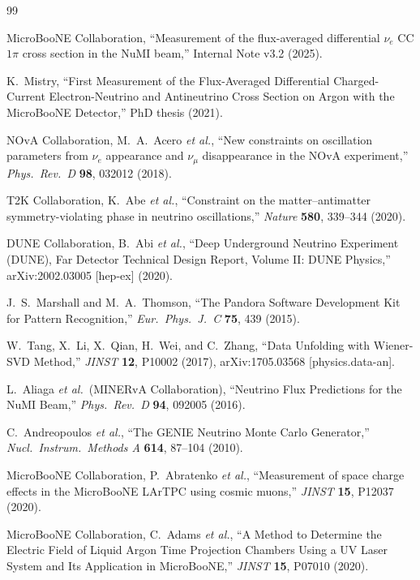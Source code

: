 \begin{thebibliography}{99}

  MicroBooNE Collaboration,
  ``Measurement of the flux-averaged differential $\nu_e$ CC$1\pi$ cross section
  in the NuMI beam,'' Internal Note v3.2 (2025).

  K.~Mistry,
  ``First Measurement of the Flux-Averaged Differential Charged-Current
  Electron-Neutrino and Antineutrino Cross Section on Argon with the MicroBooNE
  Detector,'' PhD thesis (2021).

  NOvA Collaboration, M.~A.~Acero \textit{et al.},
  ``New constraints on oscillation parameters from $\nu_e$ appearance and
  $\nu_\mu$ disappearance in the NOvA experiment,''
  \textit{Phys.\ Rev.\ D} \textbf{98}, 032012 (2018).

  T2K Collaboration, K.~Abe \textit{et al.},
  ``Constraint on the matter--antimatter symmetry-violating phase in neutrino
  oscillations,''
  \textit{Nature} \textbf{580}, 339--344 (2020).

  DUNE Collaboration, B.~Abi \textit{et al.},
  ``Deep Underground Neutrino Experiment (DUNE), Far Detector Technical Design
  Report, Volume II: DUNE Physics,'' arXiv:2002.03005 [hep-ex] (2020).

  J.~S.~Marshall and M.~A.~Thomson,
  ``The Pandora Software Development Kit for Pattern Recognition,''
  \textit{Eur.\ Phys.\ J.\ C} \textbf{75}, 439 (2015).

  W.~Tang, X.~Li, X.~Qian, H.~Wei, and C.~Zhang,
  ``Data Unfolding with Wiener-SVD Method,''
  \textit{JINST} \textbf{12}, P10002 (2017), arXiv:1705.03568 [physics.data-an].

  L.~Aliaga \textit{et al.}\ (MINERvA Collaboration),
  ``Neutrino Flux Predictions for the NuMI Beam,''
  \textit{Phys.\ Rev.\ D} \textbf{94}, 092005 (2016).

  C.~Andreopoulos \textit{et al.},
  ``The GENIE Neutrino Monte Carlo Generator,''
  \textit{Nucl.\ Instrum.\ Methods A} \textbf{614}, 87--104 (2010).

  MicroBooNE Collaboration, P.~Abratenko \textit{et al.},
  ``Measurement of space charge effects in the MicroBooNE LArTPC using cosmic
  muons,''
  \textit{JINST} \textbf{15}, P12037 (2020).

  MicroBooNE Collaboration, C.~Adams \textit{et al.},
  ``A Method to Determine the Electric Field of Liquid Argon Time Projection
  Chambers Using a UV Laser System and Its Application in MicroBooNE,''
  \textit{JINST} \textbf{15}, P07010 (2020).


\end{thebibliography}
